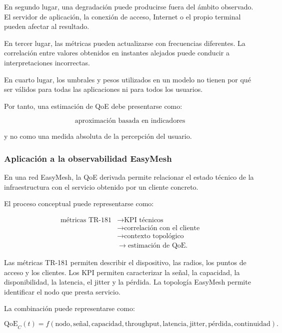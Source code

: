 En segundo lugar, una degradación puede producirse fuera del ámbito
observado. El servidor de aplicación, la conexión de acceso, Internet o
el propio terminal pueden afectar al resultado.

En tercer lugar, las métricas pueden actualizarse con frecuencias
diferentes. La correlación entre valores obtenidos en instantes alejados
puede conducir a interpretaciones incorrectas.

En cuarto lugar, los umbrales y pesos utilizados en un modelo no tienen
por qué ser válidos para todas las aplicaciones ni para todos los
usuarios.

Por tanto, una estimación de QoE debe presentarse como:

\[
    \text{aproximación basada en indicadores}
\]

y no como una medida absoluta de la percepción del usuario.


\subsubsection*{Aplicación a la observabilidad EasyMesh}

En una red EasyMesh, la QoE derivada permite relacionar el estado técnico
de la infraestructura con el servicio obtenido por un cliente concreto.

El proceso conceptual puede representarse como:

\[
\begin{aligned}
    \text{métricas TR-181}
    &\longrightarrow
    \text{KPI técnicos}\\
    &\longrightarrow
    \text{correlación con el cliente}\\
    &\longrightarrow
    \text{contexto topológico}\\
    &\longrightarrow
    \text{estimación de QoE}.
\end{aligned}
\]

Las métricas TR-181 permiten describir el dispositivo, las radios, los
puntos de acceso y los clientes. Los KPI permiten caracterizar la señal,
la capacidad, la disponibilidad, la latencia, el jitter y la pérdida. La
topología EasyMesh permite identificar el nodo que presta servicio.

La combinación puede representarse como:

\[
    \mathrm{QoE}_C(t)
    =
    f
    \left(
        \text{nodo},
        \text{señal},
        \text{capacidad},
        \text{throughput},
        \text{latencia},
        \text{jitter},
        \text{pérdida},
        \text{continuidad}
    \right).
\]

